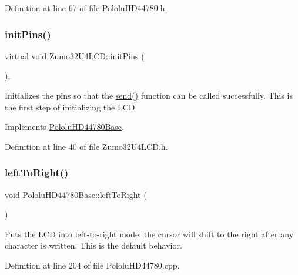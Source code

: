Definition at line 67 of file Pololu\+H\+D44780.\+h.

\mbox{\label{class_zumo32_u4_l_c_d_a15ad296b2faa2196760b816301983ea5}} 
\subsubsection{\texorpdfstring{init\+Pins()}{initPins()}}
{\footnotesize\ttfamily virtual void Zumo32\+U4\+L\+C\+D\+::init\+Pins (\begin{DoxyParamCaption}{ }\end{DoxyParamCaption})\hspace{0.3cm}{\ttfamily [inline]}, {\ttfamily [virtual]}}

Initializes the pins so that the \hyperlink{class_zumo32_u4_l_c_d_a219e5ae0c67b8a5fd359c397c69ab713}{send()} function can be called successfully. This is the first step of initializing the L\+CD. 

Implements \hyperlink{class_pololu_h_d44780_base_a9c2a2e0dfb089a6c21aa12a6a5299750}{Pololu\+H\+D44780\+Base}.



Definition at line 40 of file Zumo32\+U4\+L\+C\+D.\+h.

\mbox{\label{class_pololu_h_d44780_base_ada551bdb01681eb57bec325778eb38a6}} 
\subsubsection{\texorpdfstring{left\+To\+Right()}{leftToRight()}}
{\footnotesize\ttfamily void Pololu\+H\+D44780\+Base\+::left\+To\+Right (\begin{DoxyParamCaption}{ }\end{DoxyParamCaption})\hspace{0.3cm}{\ttfamily [inherited]}}

Puts the L\+CD into left-\/to-\/right mode\+: the cursor will shift to the right after any character is written. This is the default behavior. 

Definition at line 204 of file Pololu\+H\+D44780.\+cpp.

